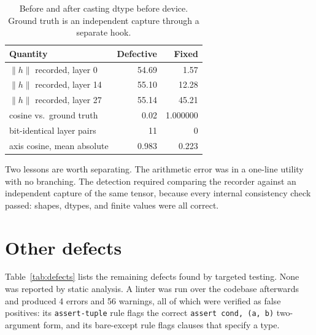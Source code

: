 \documentclass[twocolumn,10pt,a4paper]{article}
\newcommand{\code}[1]{\texttt{\small #1}}
\begin{document}
\begin{table}[t]
\centering
\small
\begin{tabular}{lrr}
\toprule
Quantity & Defective & Fixed \\
\midrule
$\lVert h \rVert$ recorded, layer 0  & 54.69 & 1.57 \\
$\lVert h \rVert$ recorded, layer 14 & 55.10 & 12.28 \\
$\lVert h \rVert$ recorded, layer 27 & 55.14 & 45.21 \\
cosine vs.\ ground truth             & 0.02  & 1.000000 \\
bit-identical layer pairs            & 11    & 0 \\
axis cosine, mean absolute           & 0.983 & 0.223 \\
\bottomrule
\end{tabular}
\caption{Before and after casting dtype before device. Ground truth is an
independent capture through a separate hook.}
\label{tab:mpsfix}
\end{table}

Two lessons are worth separating. The arithmetic error was in a one-line utility
with no branching. The detection required comparing the recorder against an
independent capture of the same tensor, because every internal consistency check
passed: shapes, dtypes, and finite values were all correct.

\section{Other defects}

Table~\ref{tab:defects} lists the remaining defects found by targeted testing.
None was reported by static analysis. A linter was run over the codebase
afterwards and produced 4 errors and 56 warnings, all of which were verified as
false positives: its \code{assert-tuple} rule flags the correct
\code{assert cond, (a, b)} two-argument form, and its bare-except rule flags
clauses that specify a type.
\end{document}
